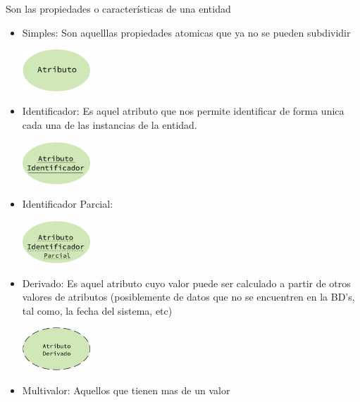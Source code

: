 \documentclass[12pt, fleqn]{report}                             %
\begin{document}
                Son las propiedades o características de una entidad
                \begin{itemize}

                    \item Simples:
                        Son aquelllas propiedades atomicas que ya no se pueden subdividir
                        
                        \includegraphics[width=0.20\textwidth]{Atributo}

                    \item Identificador:
                        Es aquel atributo que nos permite identificar de forma unica cada una de las
                        instancias de la entidad.

                        \includegraphics[width=0.20\textwidth]{AtributoID}

                    \item Identificador Parcial:

                        \includegraphics[width=0.20\textwidth]{AtributoIDParcial}

                    \item Derivado:
                        Es aquel atributo cuyo valor puede ser calculado a partir de
                        otros valores de atributos (posiblemente de datos que no se
                        encuentren en la BD's, tal como, la fecha del sistema, etc)

                        \includegraphics[width=0.20\textwidth]{AtributoDerivado}

                    \item Multivalor:
                        Aquellos que tienen mas de un valor


\end{itemize}
\end{document}
